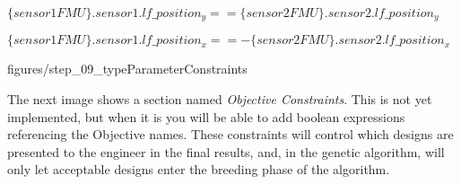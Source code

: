 \documentclass[11pt,a4paper]{../tutorial}
\begin{document}
{$\{sensor1FMU\}.sensor1.lf\_position_y == \{sensor2FMU\}.sensor2.lf\_position_y$

$\{sensor1FMU\}.sensor1.lf\_position_x == - \{sensor2FMU\}.sensor2.lf\_position_x$


\begin{center}\begin{annotation}[width=0.7\linewidth,trim=0 0 0 0,clip]{figures/step_09_typeParameterConstraints}
    \end{annotation}\end{center}














\newpage

The next image shows a section named \emph{Objective Constraints}.  This is not yet implemented, but when it is you will be able to add boolean expressions referencing the Objective names.  These constraints will control which designs are presented to the engineer in the final results, and, in the genetic algorithm, will only let acceptable designs enter the breeding phase of the algorithm.

}
\end{document}
